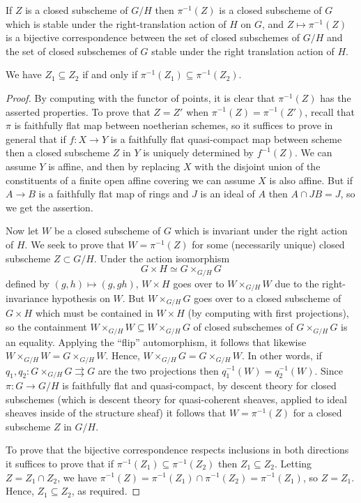 \documentclass[10pt]{article}
\renewcommand{\(}{\left(}
\renewcommand{\)}{\right)}
\numberwithin{thm}{subsection}
\begin{document}
\begin{proposition}  If $Z$ is a closed subscheme of $G/H$ then $\pi^{-1}(Z)$ is a closed
subscheme of $G$ which is stable under the right-translation action of $H$ on $G$, and
$Z \mapsto \pi^{-1}(Z)$ is a bijective correspondence between the set of
closed subschemes of $G/H$ and the set of closed subschemes of $G$ stable under
the right translation action of $H$.

We have $Z_1 \subseteq Z_2$ if and only if $\pi^{-1}(Z_1) \subseteq \pi^{-1}(Z_2)$. 
\end{proposition}

\begin{proof}
By computing with the functor of points, it is clear that $\pi^{-1}(Z)$ has the asserted properties.
To prove that $Z = Z'$ when $\pi^{-1}(Z) = \pi^{-1}(Z')$, recall that
$\pi$ is faithfully flat map between noetherian schemes, so
it suffices to prove in general that if $f:X \rightarrow Y$ is a faithfully flat
quasi-compact map between scheme then a closed subscheme $Z$ in $Y$ is uniquely
determined by $f^{-1}(Z)$.  We can assume $Y$ is affine, and then by replacing
$X$ with the disjoint union of the constituents of a finite open affine covering we
can assume $X$ is also affine.  But if $A \rightarrow B$ is a faithfully flat map
of rings and $J$ is an ideal of $A$ then $A \cap JB = J$, so we get the assertion.

Now let $W$ be a closed subscheme of $G$ which is invariant under the right action of
$H$.  We seek to prove that $W = \pi^{-1}(Z)$ for some (necessarily unique) closed
subscheme $Z \subset G/H$.   Under the action isomorphism
$$G \times H \simeq G \times_{G/H} G$$
defined by $(g,h) \mapsto (g, gh)$, $W \times H$ goes over to $W \times_{G/H} W$
due to the right-invariance hypothesis on $W$.
But $W \times_{G/H} G$ goes over to a closed subscheme of $G \times H$ which must
be contained in $W \times H$ (by computing with first projections), so the containment
$W \times_{G/H} W \subseteq W \times_{G/H} G$ of closed subschemes of 
$G \times_{G/H} G$ is an equality.  Applying the ``flip'' automorphism,
it follows that likewise $W \times_{G/H} W = G \times_{G/H} W$.  
Hence, $W \times_{G/H} G = G \times_{G/H} W$.  
In other words, if $q_1, q_2:G \times_{G/H} G \rightrightarrows G$ are the two
projections then $q_1^{-1}(W) = q_2^{-1}(W)$.  Since
$\pi:G \rightarrow G/H$ is faithfully flat and quasi-compact, by descent theory
for closed subschemes (which is descent theory for quasi-coherent sheaves, applied
to ideal sheaves inside of the structure sheaf) it follows that $W = \pi^{-1}(Z)$ for
a closed subscheme $Z$ in $G/H$.

To prove that the bijective correspondence respects inclusions in both directions it suffices
to prove that if $\pi^{-1}(Z_1) \subseteq \pi^{-1}(Z_2)$ then $Z_1 \subseteq Z_2$.
Letting $Z = Z_1 \cap Z_2$, we have $\pi^{-1}(Z) = \pi^{-1}(Z_1) \cap \pi^{-1}(Z_2) = \pi^{-1}(Z_1)$,
so $Z = Z_1$.  Hence, $Z_1 \subseteq Z_2$, as required. 
\end{proof}
\end{document}
